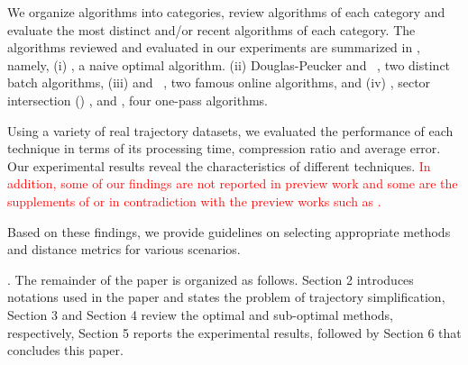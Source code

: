 We organize \lsa algorithms into categories, %
review algorithms of each category and evaluate the most distinct and/or recent algorithms of each category.
The algorithms reviewed and evaluated in our experiments are summarized in , namely,
(i) \opt\cite{Chan:Optimal, Imai:Optimal}, a naive optimal \lsa algorithm.
(ii) Douglas-Peucker\cite{Douglas:Peucker,Meratnia:Spatiotemporal} and \pavlidis~\cite{Pavlidis:Segment}, two distinct batch \lsa algorithms,
(iii) \bqsa\cite{Liu:BQS} and \squishe~\cite{Muckell:SQUISH}, two famous online \lsa algorithms, and
(iv) \operb\cite{Lin:Operb}, sector intersection (\siped) \cite{Williams:Longest,Sklansky:Cone,Dunham:Cone, Zhao:Sleeve}, \cised \cite{Lin:Cised} and \interval\cite{Ke:Interval}, four one-pass \lsa algorithms.

%
%
Using a variety of real trajectory datasets, we evaluated the performance of each technique in terms of its processing time, compression ratio and average error.
Our experimental results reveal the characteristics of different techniques.
\textcolor{red}{In addition, some of our findings are not reported in preview work and some are the supplements of or in contradiction with the preview works such as \cite{Zhang:Evaluation}.}

Based on these findings, we provide guidelines on selecting appropriate methods and distance metrics for various scenarios.

.
The remainder of the paper is organized as follows.
Section 2 introduces notations used in the paper and states the problem of trajectory simplification,
Section 3 and Section 4 review the optimal and sub-optimal \lsa methods, respectively, 
Section 5 reports the experimental results, followed by
Section 6 that concludes this paper.



